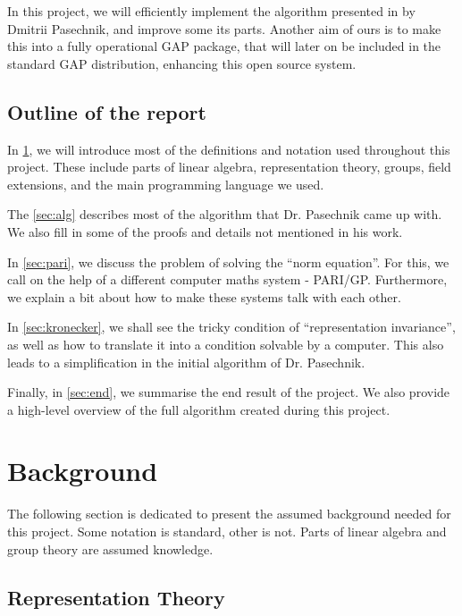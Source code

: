 \documentclass[11pt]{article}
\begin{document}
In this project, we will efficiently implement the algorithm presented
in \cite{Pas21} by Dmitrii Pasechnik, and improve some its parts. Another aim of
ours is to make this into a fully operational GAP package, that will later on
be included in the standard GAP distribution, enhancing this open source system.

\subsection{Outline of the report}
In \cref{sec:bg}, we will introduce most of the definitions and notation used
throughout this project. These include parts of linear algebra, representation
theory, groups, field extensions, and the main programming language we used.

The \cref{sec:alg} describes most of the algorithm that Dr. Pasechnik came up
with. We also fill in some of the proofs and details not mentioned in his work.

In \cref{sec:pari}, we discuss the problem of solving the ``norm equation''. For
this, we call on the help of a different computer maths system - PARI/GP.
Furthermore, we explain a bit about how to make these systems talk with each other.

In \cref{sec:kronecker}, we shall see the tricky condition of ``representation
invariance'', as well as how to translate it into a condition solvable by a
computer. This also leads to a simplification in the initial algorithm of Dr.
Pasechnik.

Finally, in \cref{sec:end}, we summarise the end result of the project. We also
provide a high-level overview of the full algorithm created during this project.

\newpage

\section{Background} \label{sec:bg}

The following section is dedicated to present the assumed background needed for
this project. Some notation is standard, other is not. Parts of linear algebra
and group theory are assumed knowledge.

\subsection{Representation Theory}
\end{document}
